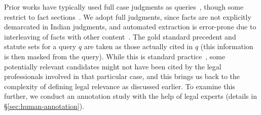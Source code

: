 \noindent Prior works have typically used full case judgments as queries~\citep{li2023coliee23,joshi2023ucreat}, though some restrict to fact sections~\cite{li2023sailer}. We adopt full judgments, since facts are not explicitly demarcated in Indian judgments, and automated extraction is error-prone due to interleaving of facts with other content~\cite{bhattacharya2023deeprhole,malik-rr-2021,kalamkar-etal-2022-corpus}. The gold standard precedent and statute sets for a query $q$ are taken as those actually cited in $q$ (this information is then masked from the query). While this is standard practice~\citep{paul2022ilsi,joshi2023ucreat,li2024coliee2024}, some potentially relevant candidates might not have been cited by the legal professionals involved in that particular case, and this brings us back to the complexity of defining legal relevance as discussed earlier. To examine this further, we conduct an  annotation study with the help of legal experts (details in \S\ref{sec:human-annotation}).





